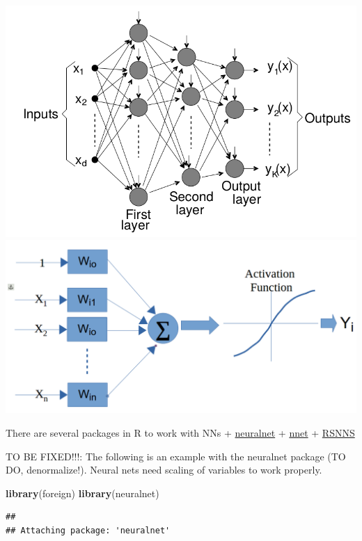 \documentclass[]{book}
\newenvironment{Shaded}{\begin{snugshade}}{\end{snugshade}}
\newcommand{\KeywordTok}[1]{\textcolor[rgb]{0.13,0.29,0.53}{\textbf{{#1}}}}
\newcommand{\NormalTok}[1]{{#1}}
\begin{document}
\includegraphics{figures/neuralnet.png}
\includegraphics{figures/neuralnet2.png}

There are several packages in R to work with NNs +
\href{https://cran.r-project.org/web/packages/neuralnet/index.html}{neuralnet}
+ \href{https://cran.r-project.org/web/packages/nnet/index.html}{nnet} +
\href{https://cran.r-project.org/web/packages/RSNNS/index.html}{RSNNS}

TO BE FIXED!!!: The following is an example with the neuralnet package
(TO DO, denormalize!). Neural nets need scaling of variables to work
properly.

\begin{Shaded}
\begin{Highlighting}[]
\KeywordTok{library}\NormalTok{(foreign)}
\KeywordTok{library}\NormalTok{(neuralnet)}
\end{Highlighting}
\end{Shaded}

\begin{verbatim}
## 
## Attaching package: 'neuralnet'
\end{verbatim}
\end{document}
